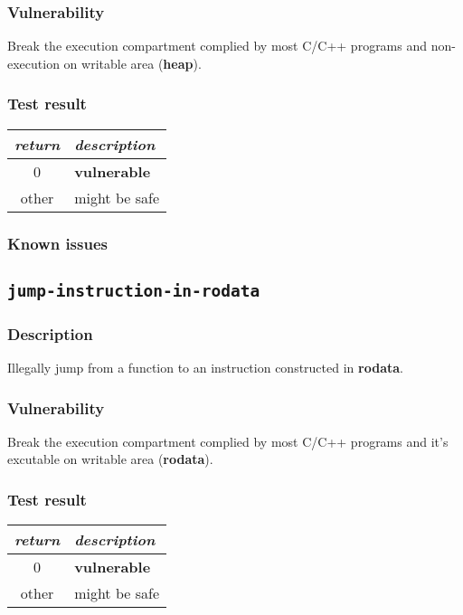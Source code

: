 \documentclass[a4paper]{book}
\begin{document}
\subsubsection{Vulnerability}
Break the execution compartment complied by most C/C++ programs and non-execution on writable area (\textbf{heap}).

\subsubsection{Test result}
\begin{tabular}{cl}
  \toprule
  \emph{return}  & \emph{description} \\
  \midrule
  0              & \textbf{vulnerable} \\
  other          & might be safe \\
  \bottomrule
\end{tabular}
  
\subsubsection{Known issues}


\newpage
\subsection{\texttt{jump-instruction-in-rodata}}\label{test-jump-instruction-in-rodata}

\subsubsection{Description}
Illegally jump from a function to an instruction constructed in \textbf{rodata}.

\subsubsection{Vulnerability}
Break the execution compartment complied by most C/C++ programs and it’s excutable on writable area (\textbf{rodata}).

\subsubsection{Test result}
\begin{tabular}{cl}
  \toprule
  \emph{return}  & \emph{description} \\
  \midrule
  0              & \textbf{vulnerable} \\
  other          & might be safe \\
  \bottomrule
\end{tabular}
  
\end{document}
